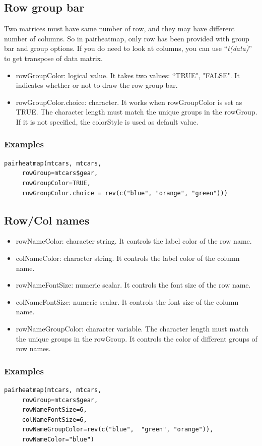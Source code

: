 \documentclass[a4paper]{article}
\begin{document}
\subsection{Row group bar}
Two matrices must have same number of row, and they may have different number of columns. So in pairheatmap, only row has been provided with group bar and group options. If you do need to look at columns, you can use ``\textit{t(data)}'' to get transpose of data matrix.\begin{itemize}
	\item rowGroupColor: logical value. It takes two values: ``TRUE", "FALSE". It indicates whether or not to draw the row group bar.
	\item rowGroupColor.choice: character. It works when rowGroupColor is set as TRUE. The character length must match the unique groups in the rowGroup. If it is not specified, the colorStyle is used as default value. 
\end{itemize}
\subsubsection{Examples}
\begin{verbatim}
pairheatmap(mtcars, mtcars,
     rowGroup=mtcars$gear,
     rowGroupColor=TRUE,
     rowGroupColor.choice = rev(c("blue", "orange", "green")))
\end{verbatim}
\subsection{Row/Col names}
\begin{itemize}
	\item rowNameColor: character string. It controls the label color of the row name.
	\item colNameColor: character string. It controls the label color of the column name.
	\item rowNameFontSize: numeric scalar. It controls the font size of the row name.
	\item colNameFontSize: numeric scalar. It controls the font size of the column name.
	\item rowNameGroupColor: character variable. The character length must match the unique groups in the rowGroup. It controls the color of different groups of row names. 
\end{itemize}
\subsubsection{Examples}
\begin{verbatim}
pairheatmap(mtcars, mtcars,
     rowGroup=mtcars$gear,
     rowNameFontSize=6,
     colNameFontSize=6,
     rowNameGroupColor=rev(c("blue",  "green", "orange")),
     rowNameColor="blue")
\end{verbatim}
\end{document}
